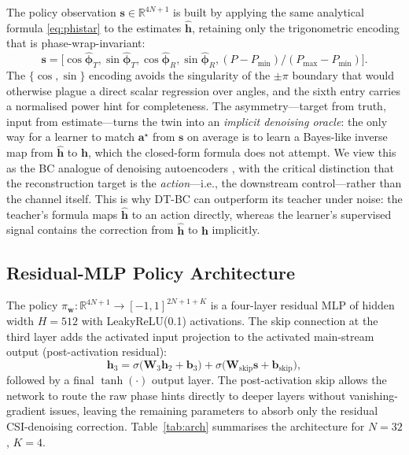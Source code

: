 \documentclass[journal]{IEEEtran}
\newcommand{\vect}[1]{\bm{#1}}
\newcommand{\mat}[1]{\mathbf{#1}}
\newcommand{\R}{\mathbb{R}}
\begin{document}
The policy observation $\vect{s}\!\in\!\R^{4N+1}$ is built by
applying the same analytical formula \eqref{eq:phistar} to the
estimates $\hat{\vect{h}}$, retaining only the trigonometric
encoding that is phase-wrap-invariant:
\begin{equation}
\!\!\!\vect{s}=\!\bigl[\cos\hat{\vect{\phi}}_T,\sin\hat{\vect{\phi}}_T,
                \cos\hat{\vect{\phi}}_R,\sin\hat{\vect{\phi}}_R,
                (P\!-\!P_{\min})\!/\!(P_{\max}\!-\!P_{\min})\bigr].
  \label{eq:obs}
\end{equation}
The $\{\cos,\sin\}$ encoding avoids the singularity of the
$\pm\pi$ boundary that would otherwise plague a direct scalar
regression over angles, and the sixth entry carries a normalised
power hint for completeness. The asymmetry---target from truth,
input from estimate---turns the twin into an \emph{implicit
denoising oracle}: the only way for a learner to match
$\vect{a}^\star$ from $\vect{s}$ on average is to learn a Bayes-like
inverse map from $\hat{\vect{h}}$ to $\vect{h}$, which the
closed-form formula does not attempt. We view this as the BC
analogue of denoising autoencoders \cite{vincent2010stacked}, with
the critical distinction that the reconstruction target is the
\emph{action}---i.e., the downstream control---rather than the
channel itself. This is why DT-BC can outperform its teacher under
noise: the teacher's formula maps $\hat{\vect{h}}$ to an action
directly, whereas the learner's supervised signal contains the
correction from $\hat{\vect{h}}$ to $\vect{h}$ implicitly.

\subsection{Residual-MLP Policy Architecture}

The policy $\pi_{\vect{w}}:\R^{4N+1}\!\to\![-1,1]^{2N+1+K}$ is a
four-layer residual MLP of hidden width $H\!=\!512$ with
LeakyReLU(0.1) activations. The skip connection at the third layer
adds the activated input projection to the activated main-stream
output (post-activation residual):
\begin{equation}
  \vect{h}_{3}=\sigma\!\bigl(\mat{W}_{3}\vect{h}_{2}+\vect{b}_3\bigr)
              +\sigma\!\bigl(\mat{W}_{\mathrm{skip}}\vect{s}
                             +\vect{b}_{\mathrm{skip}}\bigr),
  \label{eq:resnet}
\end{equation}
followed by a final $\tanh(\cdot)$ output layer. The post-activation
skip allows the network to route the raw phase hints directly to
deeper layers without vanishing-gradient issues, leaving the
remaining parameters to absorb only the residual CSI-denoising
correction. Table~\ref{tab:arch} summarises the architecture for
$N\!=\!32$, $K\!=\!4$.
\end{document}
